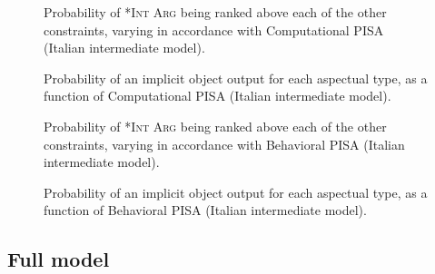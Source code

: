 
\begin{figure}[htb]
\caption{Probability of \textsc{*Int Arg} being ranked above each of the other constraints, varying in accordance with Computational PISA (Italian intermediate model).}
    
\end{figure}

\begin{figure}[htb]
\caption{Probability of an implicit object output for each aspectual type, as a function of Computational PISA (Italian intermediate model).}
    
\end{figure}



\begin{figure}[htb]
\caption{Probability of \textsc{*Int Arg} being ranked above each of the other constraints, varying in accordance with Behavioral PISA (Italian intermediate model).}
    
\end{figure}

\begin{figure}[htb]
\caption{Probability of an implicit object output for each aspectual type, as a function of Behavioral PISA (Italian intermediate model).}
    
\end{figure}



\subsection{Full model} 


